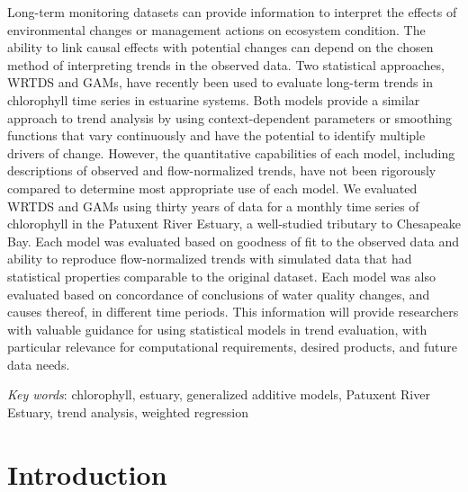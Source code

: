 \documentclass[letterpaper,12pt,oneside]{article}\usepackage[]{graphicx}\usepackage[]{color}
\begin{document}
\noindent Long-term monitoring datasets can provide information to interpret the effects of environmental changes or management actions on ecosystem condition.  The ability to link causal effects with potential changes can depend on the chosen method of interpreting trends in the observed data.  Two statistical approaches, \ac{WRTDS} and \acp{GAM}, have recently been used to evaluate long-term trends in chlorophyll time series in estuarine systems.  Both models provide a similar approach to trend analysis by using context-dependent parameters or smoothing functions that vary continuously and have the potential to identify multiple drivers of change.  However, the quantitative capabilities of each model, including descriptions of observed and flow-normalized trends, have not been rigorously compared to determine most appropriate use of each model.  We evaluated \ac{WRTDS} and \acp{GAM} using thirty years of data for a monthly time series of chlorophyll in the Patuxent River Estuary, a well-studied tributary to Chesapeake Bay.  Each model was evaluated based on goodness of fit to the observed data and ability to reproduce flow-normalized trends with simulated data that had statistical properties comparable to the original dataset.  Each model was also evaluated based on concordance of conclusions of water quality changes, and causes thereof, in different time periods.  This information will provide researchers with valuable guidance for using statistical models in trend evaluation, with particular relevance for computational requirements, desired products, and future data needs.  

\noindent \textit{Key words}: chlorophyll, estuary, generalized additive models, Patuxent River Estuary, trend analysis, weighted regression

\clearpage

\acresetall

\section{Introduction}
\end{document}
